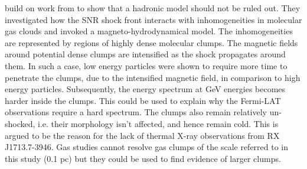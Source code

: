 \documentclass[12pt,a4paper]{article}
\begin{document}
\cite{2018arXiv180410579C} build on work from \cite{2012ApJ...744...71I,2014MNRAS.445L..70G} to show that a hadronic model should not be ruled out. They investigated how the SNR shock front interacts with inhomogeneities in molecular gas clouds and invoked a magneto-hydrodynamical model. The inhomogeneities are represented by regions of highly dense molecular clumps. The magnetic fields around potential dense clumps are intensified as the shock propagates around them. In such a case, low energy particles were shown to require more time to penetrate the clumps, due to the intensified magnetic field, in comparison to high energy particles. Subsequently, the energy spectrum at GeV energies becomes harder inside the clumps. This could be used to explain why the Fermi-LAT observations require a hard spectrum. The clumps also remain relatively un-shocked, i.e. their morphology isn't affected, and hence remain cold. This is argued to be the reason for the lack of thermal X-ray observations from RX J1713.7-3946. Gas studies cannot resolve gas clumps of the scale referred to in this study (0.1 pc) but they could be used to find evidence of larger clumps.
\end{document}
